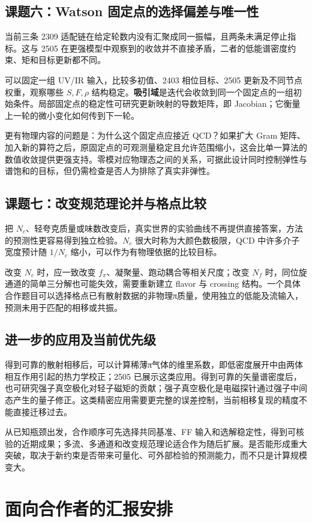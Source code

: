 \documentclass[UTF8,a4paper,11pt,fontset=fandol]{ctexart}
\numberwithin{equation}{section}
\newcommand{\newchapter}[1]{\FloatBarrier\Needspace{9\baselineskip}\section{#1}}
\begin{document}
\subsection{课题六：Watson 固定点的选择偏差与唯一性}
当前三条 2309 适配链在给定轮数内没有汇聚成同一振幅，且两条未满足停止指标。这与 2505 在更强模型中观察到的收敛并不直接矛盾，二者的低能谱密度约束、矩和目标更新都不同。

可以固定一组 UV/IR 输入，比较多初值、2403 相位目标、2505 更新及不同节点权重，观察哪些 \(S,F,\rho\) 结构稳定。\textbf{吸引域}是迭代会收敛到同一个固定点的一组初始条件。局部固定点的稳定性可研究更新映射的导数矩阵，即 Jacobian；它衡量上一轮的微小变化如何传到下一轮。

更有物理内容的问题是：为什么这个固定点应接近 QCD？如果扩大 Gram 矩阵、加入新的算符之后，原固定点的可观测量稳定且允许范围缩小，这会比单一算法的数值收敛提供更强支持。零模对应物理态之间的关系，可据此设计同时控制弹性与谱饱和的目标，但仍需检查是否人为排除了真实非弹性。

\subsection{课题七：改变规范理论并与格点比较}
把 \(N_c\)、轻夸克质量或味数改变后，真实世界的实验曲线不再提供直接答案，方法的预测性更容易得到独立检验。\(N_c\) 很大时称为大颜色数极限，QCD 中许多介子宽度预计随 \(1/N_c\) 缩小，可以作为有物理依据的比较目标。

改变 \(N_c\) 时，应一致改变 \(f_\pi\)、凝聚量、跑动耦合等相关尺度；改变 \(N_f\) 时，同位旋通道的简单三分解也可能失效，需要重新建立 flavor 与 crossing 结构。一个具体合作题目可以选择格点已有散射数据的非物理π质量，使用独立的低能及流输入，预测未用于匹配的相移或共振。

\subsection{进一步的应用及当前优先级}
得到可靠的散射相移后，可以计算稀薄π气体的维里系数，即低密度展开中由两体相互作用引起的热力学校正；2505 已展示这类应用。得到可靠的矢量谱密度后，也可研究强子真空极化对轻子磁矩的贡献；强子真空极化是电磁探针通过强子中间态产生的量子修正。这类精密应用需要更完整的误差控制，当前相移复现的精度不能直接迁移过去。

从已知瓶颈出发，合作顺序可先选择共同基准、FF 输入和选解稳定性，得到可核验的近期成果；多流、多通道和改变规范理论适合作为随后扩展。是否能形成重大突破，取决于新约束是否带来可量化、可外部检验的预测能力，而不只是计算规模变大。
\newchapter{面向合作者的汇报安排}\label{sec:talk}
\end{document}
